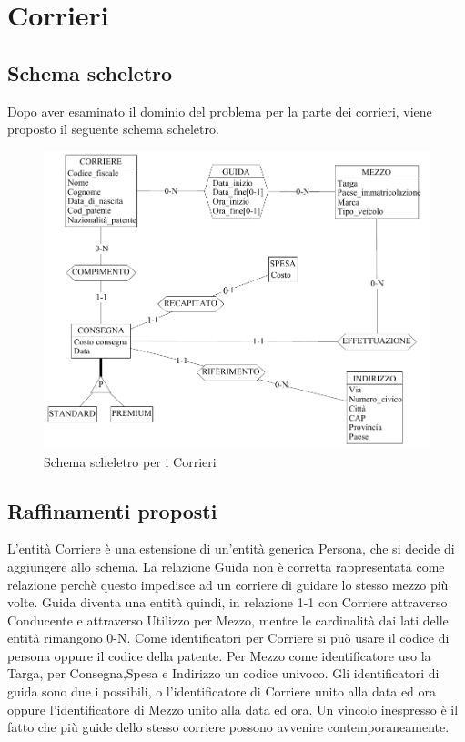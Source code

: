 \documentclass[a4paper,12pt]{report}
\begin{document}
\section{Corrieri}
\subsection{Schema scheletro}
Dopo aver esaminato il dominio del problema per la parte dei corrieri, viene proposto il seguente schema scheletro.
\begin{figure}[H]
	\centering{}
	\includegraphics[width=\textwidth]{img/SchemaConcettuale-Corrieri1.pdf}
	\caption{Schema scheletro per i Corrieri}
\end{figure}
\subsection{Raffinamenti proposti}
L'entità Corriere è una estensione di un'entità generica Persona, che si decide di aggiungere allo schema. 
La relazione Guida non è corretta rappresentata come relazione perchè questo impedisce ad un corriere di guidare lo stesso mezzo più volte. 
Guida diventa una entità quindi, in relazione 1-1 con Corriere attraverso Conducente e attraverso Utilizzo per Mezzo, mentre le cardinalità dai lati delle entità rimangono 0-N. 
Come identificatori per Corriere si può usare il codice di persona oppure il codice della patente. 
Per Mezzo come identificatore uso la Targa, per Consegna,Spesa e Indirizzo un codice univoco. 
Gli identificatori di guida sono due i possibili, o l'identificatore di Corriere unito alla data ed ora oppure l'identificatore di Mezzo unito alla data ed ora. 
Un vincolo inespresso è il fatto che più guide dello stesso corriere possono avvenire contemporaneamente. 
\end{document}
